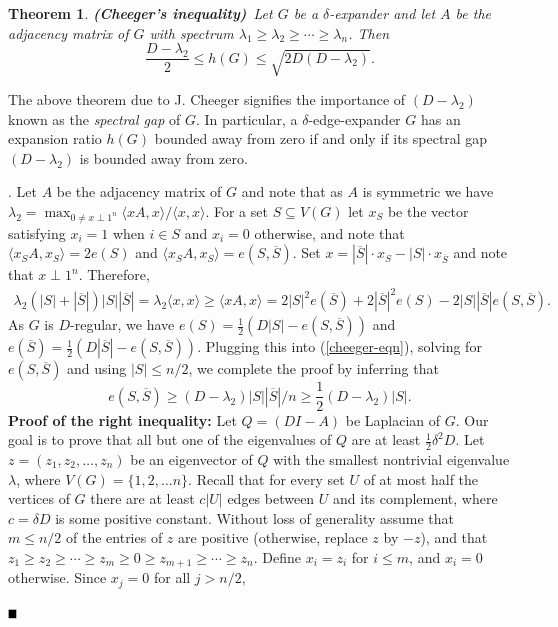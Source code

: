 \documentclass{article}
\newtheorem{theorem}{Theorem}[section]
\newcommand{\bproof}{\noindent{\bf Proof}}
\newcommand{\eproof}{\hspace*{\fill}$\rule{2mm}{2mm}$~~~~\bigskip}
\renewenvironment{proof}{\bproof. }{\eproof}
\begin{document}
\begin{theorem}{\rm {\bf (Cheeger's inequality)}\cite{Che1970}}\label{cheeger}
~Let $G$ be a $\delta$-expander and let $A$ be the adjacency matrix of $G$ with spectrum $\lambda _1\geq \lambda _2\geq\cdots\geq \lambda _n$. Then
\[
\frac{D-\lambda _2}{2}\leq h(G)\leq \sqrt{2D(D-\lambda _2)}.
\]
\end{theorem}
The above theorem due to J. Cheeger \cite{Che1970} signifies the importance of $(D-\lambda _2)$ known as the {\it spectral gap} of $G$. In particular, a $\delta$-edge-expander $G$ has an expansion ratio $h(G)$ bounded away from zero if and only if its spectral gap $(D-\lambda _2)$  is bounded away from zero.

\begin{proof} \cite[Theorem 1.1, pp. 324]{ASS2008} Let $A$ be the adjacency matrix of $G$ and note that as $A$ is symmetric we have $\lambda_2=\max_{0\neq x\perp 1^n}\langle xA,x\rangle/\langle x,x\rangle$. For a set $S\subseteq V(G)$ let $x_S$ be the vector satisfying $x_i=1$ when $i\in S$ and $x_i=0$ otherwise, and note that $\langle x_SA,x_S\rangle=2e(S)$ and $\langle x_SA,x_S\rangle=e(S,\overline{S})$. Set $x=|\overline{S}|\cdot x_S-|S|\cdot x_{\overline{S}}$ and note that $x\perp 1^n$. Therefore,
\begin{eqnarray}\label{cheeger-eqn}
\lambda_2(|S|+|\overline{S}|)|S||\overline{S}|=\lambda_2\langle x,x\rangle\geq\langle xA,x\rangle=2|S|^2e(\overline{S})+2|\overline{S}|^2e(S)-2|S||\overline{S}|e(S,\overline{S}).
\end{eqnarray}
As $G$ is $D$-regular, we have $e(S)=\frac{1}{2}(D|S|-e(S,\overline{S}))$ and $e(\overline{S})=\frac{1}{2}(D|\overline{S}|-e(S,\overline{S}))$. Plugging this into (\ref{cheeger-eqn}), solving for $e(S,\overline{S})$ and using $|S|\leq n/2$, we complete the proof by inferring that
\[
e(S,\overline{S})\geq (D-\lambda_2)|S||\overline{S}|/n\geq \frac{1}{2}(D-\lambda_2)|S|.
\]
{\bf Proof of the right inequality:} \cite[Theorem 1.1, pp. 326]{ASS2008} Let $Q=(DI-A)$ be Laplacian of $G$. Our goal is to prove that all but one of the eigenvalues of $Q$ are at least $\frac{1}{2}\delta^2D$. Let $z=(z_1,z_2,\ldots ,z_n)$ be an eigenvector of $Q$ with the smallest nontrivial eigenvalue $\lambda$, where $V(G)=\{1,2,\ldots n\}$. Recall that for every set $U$ of at most half the vertices of $G$ there are at least $c|U|$ edges between $U$ and its complement, where $c=\delta D$ is some positive constant. Without loss of generality assume that $m\leq n/2$ of the entries of $z$ are positive (otherwise, replace $z$ by $-z$), and that $z_1\geq z_2\geq\cdots\geq z_m\geq 0\geq z_{m+1}\geq\cdots \geq z_n$. Define $x_i=z_i$ for $i\leq m$, and $x_i=0$ otherwise. Since $x_j=0$ for all $j> n/2$,

\end{proof}
\end{document}
